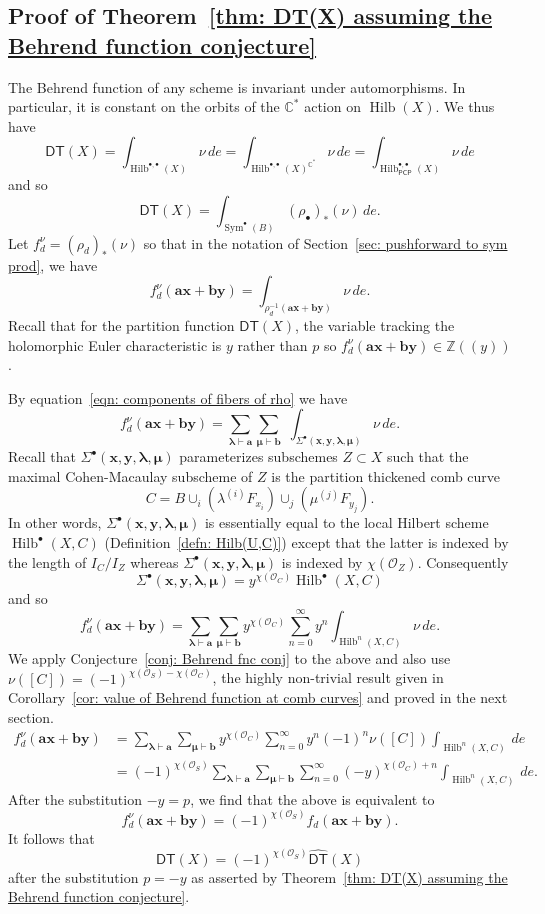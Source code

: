\documentclass[12pt]{amsart}
\theoremstyle{definition}
\newcommand{\CC} {\mathbb{C}}          %
\newcommand{\ZZ} {\mathbb{Z}}		%
\renewcommand{\O}{\mathcal{O}}
\newcommand{\Sym}{\operatorname{Sym}}
\newcommand{\Hilb}{\operatorname{Hilb}}
\newcommand{\DT}{\mathsf{DT}}
\newcommand{\boldx}{\boldsymbol{x}}
\newcommand{\boldy}{\boldsymbol{y}}
\newcommand{\bolda}{\boldsymbol{a}}
\newcommand{\boldb}{\boldsymbol{b}}
\newcommand{\boldlambda}{\boldsymbol{\lambda }}
\newcommand{\boldmu}{\boldsymbol{\mu }}
\newcommand{\Sigmaxylambdamu}{\Sigma^{\bullet }(\boldx ,\boldy ,\boldlambda ,\boldmu )}
\newcommand{\DThat}{\widehat{\DT}}
\newcommand{\PCP}{\mathsf{PCP}}
\begin{document}
\subsection{Proof of Theorem~\ref{thm: DT(X) assuming the Behrend
function conjecture}}

The Behrend function of any scheme is invariant under
automorphisms. In particular, it is constant on the orbits of the
$\CC^{*}$ action on $\Hilb (X)$. We thus have
\[
\DT (X) = \int_{\Hilb^{\bullet ,\bullet}(X)} \nu \, de =
\int_{\Hilb^{\bullet ,\bullet}(X)^{\CC^{*}}} \nu \, de =
\int_{\Hilb_{\PCP }^{\bullet ,\bullet}(X)} \nu \, de
\]
and so
\[
\DT (X)  =\int_{\Sym^{\bullet}(B)} (\rho_{\bullet})_{*} (\nu )\, de.
\]
Let $f^{\nu}_{d} = (\rho_{d})_{*}(\nu )$ so that in the notation of
Section~\ref{sec: pushforward to sym prod}, we have
\[
f^{\nu}_{d}(\bolda \boldx +\boldb \boldy ) =
\int_{\rho^{-1}_{d}(\bolda \boldx +\boldb \boldy )} \nu \, de.
\]
Recall that for the partition function $\DT (X)$, the variable
tracking the holomorphic Euler characteristic is $y$ rather than $p$
so $f_{d}^{\nu}(\bolda \boldx +\boldb \boldy )\in \ZZ (\!(y)\!)$.

By equation~\eqref{eqn: components of fibers of rho} we have
\[
f_{d}^{\nu}(\bolda \boldx +\boldb \boldy ) = \sum_{\boldlambda \vdash
\bolda} \sum_{\boldmu \vdash \boldb} \,\, \int_{\Sigmaxylambdamu} \nu \, de.
\]
Recall that $\Sigmaxylambdamu$ parameterizes subschemes $Z\subset X$
such that the maximal Cohen-Macaulay subscheme of $Z$ is the partition
thickened comb curve
\[
C=B \cup_{i}\left(\lambda^{(i)}F_{x_{i}} \right) \cup_{j}\left(\mu^{(j)}F_{y_{j}} \right).
\]
In other words, $\Sigmaxylambdamu$ is essentially equal to the local
Hilbert scheme $\Hilb^{\bullet}(X,C)$ (Definition~\ref{defn:
Hilb(U,C)}) except that the latter is indexed by the length of
$I_{C}/I_{Z}$ whereas $\Sigmaxylambdamu$ is indexed by $\chi
(\O_{Z})$. Consequently
\[
\Sigmaxylambdamu  = y^{\chi (\O_{C})} \Hilb^{\bullet}(X,C)
\]
and so 
\[
f_{d}^{\nu}(\bolda \boldx +\boldb \boldy ) = \sum_{\boldlambda \vdash
\bolda} \sum_{\boldmu \vdash \boldb} y^{\chi
(\O_{C})}\sum_{n=0}^{\infty}y^{n} \int_{\Hilb^{n}(X,C)} \nu \, de.
\]
We apply Conjecture~\ref{conj: Behrend fnc conj} to the above and also
use $\nu ([C]) = (-1)^{\chi (\O_{S})-\chi (\O_{C})}$, the highly
non-trivial result given in Corollary~\ref{cor: value of Behrend
function at comb curves} and proved in the next section. 
\begin{align*}
f_{d}^{\nu}(\bolda \boldx +\boldb \boldy )& = \sum_{\boldlambda \vdash
\bolda} \sum_{\boldmu \vdash \boldb} y^{\chi
(\O_{C})}\sum_{n=0}^{\infty} y^{n}(-1)^{n}\nu ([C]) \int_{\Hilb^{n}(X,C)}  \, de\\
&=(-1)^{\chi (\O_{S})} \sum_{\boldlambda \vdash \bolda} \sum_{\boldmu
\vdash \boldb} \sum_{n=0}^{\infty} (-y)^{\chi (\O_{C})+n}
\int_{\Hilb^{n}(X,C)} \, de.
\end{align*}
After the substitution $-y=p$, we find that the above is equivalent to 
\[
f^{\nu}_{d}(\bolda \boldx +\boldb \boldy ) = (-1)^{\chi (\O_{S})}
f_{d}(\bolda \boldx +\boldb \boldy ).
\]
It follows that 
\[
\DT (X) = (-1)^{\chi (\O_{S})} \DThat (X)
\]
after the substitution $p=-y$ as asserted by Theorem~\ref{thm: DT(X)
assuming the Behrend function conjecture}.
\end{document}
